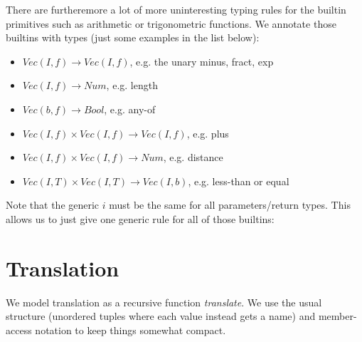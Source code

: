 \documentclass[letterpaper,12pt]{article}
\begin{document}
There are furtheremore a lot of more uninteresting typing rules for
the builtin primitives such as arithmetic or trigonometric functions.
We annotate those builtins with types (just some examples in the list below):

\begin{itemize}
	\item $Vec(I,f) \rightarrow Vec(I,f)$, e.g. the unary minus, fract, exp
	\item $Vec(I,f) \rightarrow Num$, e.g. length
	\item $Vec(b,f) \rightarrow Bool$, e.g. any-of
	\item $Vec(I,f) \times Vec(I,f) \rightarrow Vec(I,f)$, e.g. plus
	\item $Vec(I,f) \times Vec(I,f) \rightarrow Num$, e.g. distance
	\item $Vec(I,T) \times Vec(I,T) \rightarrow Vec(I,b)$, e.g. less-than or equal
\end{itemize}

Note that the generic $i$ must be the same for all parameters/return types.
This allows us to just give one generic rule for all of those builtins:

\begin{prooftree}
\end{prooftree}


\section{Translation}

We model translation as a recursive function \textit{translate}.
We use the usual structure (unordered tuples where each value
instead gets a name) and member-access notation to keep things
somewhat compact.
\end{document}
